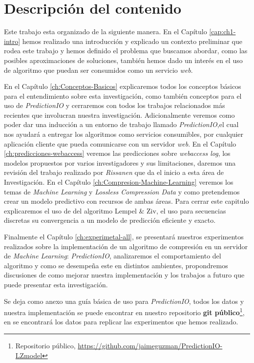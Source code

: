 \section{Descripción del contenido} 

Este trabajo esta organizado de la siguiente manera. En el Capítulo \ref{cap:ch1-intro} hemos realizado una introducción y  explicado un contexto preliminar que rodea este trabajo y hemos definido el problema que buscamos abordar, como las posibles aproximaciones de soluciones, también hemos dado un interés en el uso de algoritmo que puedan ser consumidos como un servicio \emph{web}.

En el Capítulo \ref{ch:Conceptos-Basicos} explicaremos todos los conceptos básicos para el entendimiento sobre esta investigación, como también conceptos para el uso de \emph{PredictionIO} y cerraremos con todos los trabajos relacionados más recientes que involucran nuestra investigación. Adicionalmente veremos como poder dar una inducción a un entorno de trabajo llamado \emph{PredictionIO},el cual nos ayudará a entregar los algoritmos como servicios consumibles, por cualquier aplicación cliente que pueda comunicarse con un servidor \emph{web}. En el Capítulo \ref{ch:predicciones-webaccess} veremos las predicciones sobre \emph{webaccess log}, los modelos propuestos por varios investigadores y sus limitaciones, daremos una revisión del trabajo realizado por \emph{Rissanen}\cite{Rissanen1984} que da el inicio a esta área de Investigación.
En el Capítulo \ref{ch:Compresion-Machine-Learning} veremos los temas de \emph{Machine Learning} y \emph{Lossless Compression Data} y como pretendemos crear un modelo predictivo con recursos de ambas áreas. Para cerrar este capitulo explicaremos el uso de del algoritmo Lempel \& Ziv, el uso para secuencias discretas su convergencia a un modelo de predicción eficiente y exacto. 

Finalmente el Capítulo \ref{ch:experimetal-all}, se presentará nuestros experimentos realizados sobre la implementación de un algoritmo de compresión en un servidor de \emph{Machine Learning}: \emph{PredictionIO}, analizaremos el comportamiento del algoritmo y como se desempeña este en distintos ambientes, propondremos discusiones de como mejorar nuestra implementación y los trabajos a futuro que puede presentar esta investigación.

Se deja como anexo una guía básica de uso para \emph{PredictionIO}, todos los datos y nuestra implementación se puede encontrar en nuestro repositorio \textbf{git público}\footnote{Repositorio público, \url{https://github.com/jaimeguzman/PredictionIO-LZmodel}}, en se encontrará  los datos para replicar las experimentos que hemos realizado. 
